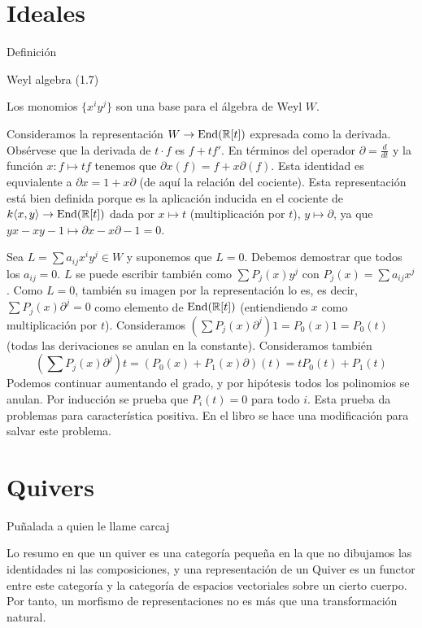 \documentclass[ANAyTR.tex]{subfiles}
\begin{document}
\section{Ideales}

Definición

Weyl algebra (1.7)

\begin{prop}
Los monomios $\{x^iy^j\}$ son una base para el álgebra de Weyl $W$.
\end{prop}
\begin{dem}
Consideramos la representación $W\to\operatorname{End}(\mathbb{R}[t])$ expresada como la derivada. Obsérvese que la derivada de $t\cdot f$ es $f+tf'$. En términos del operador $\partial=\frac{d}{dt}$ y la función $x: f\mapsto tf$ tenemos que $\partial x(f)=f+x\partial (f)$. Esta identidad es equvialente a $\partial x=1+x\partial$ (de aquí la relación del cociente). Esta representación está bien definida porque es la aplicación inducida en el cociente de $k\langle{x,y}\rangle\to\operatorname{End}(\mathbb{R}[t])$ dada por $x\mapsto t$ (multiplicación por $t$), $y\mapsto\partial$, ya que $yx-xy-1\mapsto \partial x-x\partial -1=0$. 

Sea $L=\sum a_{ij}x^iy^j\in W$ y suponemos que $L=0$. Debemos demostrar que todos los $a_{ij}=0$. $L$ se puede escribir también como $\sum P_j(x)y^j$ con $P_j(x)=\sum a_{ij}x^j$. Como $L=0$, también su imagen por la representación lo es, es decir, $\sum P_j(x)\partial^j=0$ como elemento de $\operatorname{End}(\mathbb{R}[t])$ (entiendiendo $x$ como multiplicación por $t$). Consideramos $(\sum P_j(x)\partial^j)1=P_0(x)1=P_0(t)$ (todas las derivaciones se anulan en la constante). Consideramos también 
\[
(\sum P_j(x)\partial^j)t=(P_0(x)+P_1(x)\partial)(t)=tP_0(t)+P_1(t)
\]
Podemos continuar aumentando el grado, y por hipótesis todos los polinomios se anulan. Por inducción se prueba que $P_i(t)=0$ para todo $i$. Esta prueba da problemas para característica positiva. En el libro se hace una modificación para salvar este problema.

\end{dem}


\section{Quivers}

Puñalada a quien le llame carcaj

Lo resumo en que un quiver es una categoría pequeña en la que no dibujamos las identidades ni las composiciones, y una representación de un Quiver es un functor entre este categoría y la categoría de espacios vectoriales sobre un cierto cuerpo. Por tanto, un morfismo de representaciones no es más que una transformación natural. 
\end{document}

